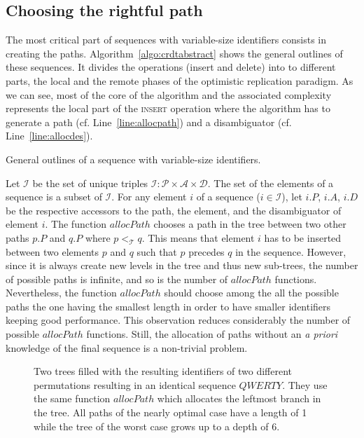 \subsection{Choosing the rightful path}
\label{subsec:choosing}

The most critical part of sequences with variable-size identifiers consists in
creating the paths. Algorithm~\ref{algo:crdtabstract} shows the general outlines
of these sequences. It divides the operations (insert and delete) into to
different parts, the local and the remote phases of the optimistic replication
paradigm. As we can see, most of the core of the algorithm and the associated
complexity represents the local part of the \textsc{insert} operation where the
algorithm has to generate a path (cf. Line~\ref{line:allocpath}) and a
disambiguator (cf. Line~\ref{line:allocdes}).

\begin{algorithm}[h]
  
  \caption{\label{algo:crdtabstract}General outlines of a sequence with
    variable-size identifiers.}
\end{algorithm}

Let $\mathcal{I}$ be the set of unique triples
$\mathcal{I}: \mathcal{P}\times\mathcal{A}\times\mathcal{D}$. The set of the
elements of a sequence is a subset of $\mathcal{I}$. For any element $i$ of a
sequence ($i \in \mathcal{I}$), let $i.P$, $i.A$, $i.D$ be the respective
accessors to the path, the element, and the disambiguator of element $i$. The
function $allocPath$ chooses a path in the tree between two other paths $p.P$
and $q.P$ where $p<_{\mathcal{T}}q$. This means that element $i$ has to be
inserted between two elements $p$ and $q$ such that $p$ precedes $q$ in the
sequence. However, since it is always create new levels in the tree and thus
new sub-trees, the number of possible paths is infinite, and so is the number
of $allocPath$ functions. Nevertheless, the function $allocPath$ should choose
among the all the possible paths the one having the smallest length in order to
have smaller identifiers keeping good performance. This observation reduces
considerably the number of possible $allocPath$ functions. Still, the
allocation of paths without an \emph{a priori} knowledge of the final sequence
is a non-trivial problem.

\begin{figure*}
  \centering
  \hspace{50pt}
  \caption{\label{fig:allocpathexample} Two trees filled with the resulting
    identifiers of two different permutations resulting in an identical
    sequence $QWERTY$. They use the same function $allocPath$ which allocates
    the leftmost branch in the tree. All paths of the nearly optimal case have
    a length of 1 while the tree of the worst case grows up to a depth of 6.}
\end{figure*}

